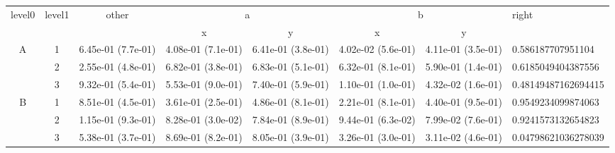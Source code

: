 \begin{tabular}{cccccccl}
\toprule
\multirow{2}{*}{level0} & \multirow{2}{*}{level1}& \multirow{2}{*}{other}&\multicolumn{2}{c}{a}&\multicolumn{2}{c}{b}& \multirow{2}{*}{right}\tabularnewline
\cmidrule(lr){4-5}
\cmidrule(lr){6-7}
&&&x&y&x&y\tabularnewline
\midrule
\multirow{3}{*}{A}&1& 6.45e-01 (7.7e-01)& 4.08e-01 (7.1e-01)& 6.41e-01 (3.8e-01)& 4.02e-02 (5.6e-01)& 4.11e-01 (3.5e-01)& 0.586187707951104\tabularnewline
&2& 2.55e-01 (4.8e-01)& 6.82e-01 (3.8e-01)& 6.83e-01 (5.1e-01)& 6.32e-01 (8.1e-01)& 5.90e-01 (1.4e-01)& 0.6185049404387556\tabularnewline
&3& 9.32e-01 (5.4e-01)& 5.53e-01 (9.0e-01)& 7.40e-01 (5.9e-01)& 1.10e-01 (1.0e-01)& 4.32e-02 (1.6e-01)& 0.48149487162694415\tabularnewline
\midrule
\multirow{3}{*}{B}&1& 8.51e-01 (4.5e-01)& 3.61e-01 (2.5e-01)& 4.86e-01 (8.1e-01)& 2.21e-01 (8.1e-01)& 4.40e-01 (9.5e-01)& 0.9549234099874063\tabularnewline
&2& 1.15e-01 (9.3e-01)& 8.28e-01 (3.0e-02)& 7.84e-01 (8.9e-01)& 9.44e-01 (6.3e-02)& 7.99e-02 (7.6e-01)& 0.9241573132654823\tabularnewline
&3& 5.38e-01 (3.7e-01)& 8.69e-01 (8.2e-01)& 8.05e-01 (3.9e-01)& 3.26e-01 (3.0e-01)& 3.11e-02 (4.6e-01)& 0.04798621036278039\tabularnewline
\bottomrule
\end{tabular}
